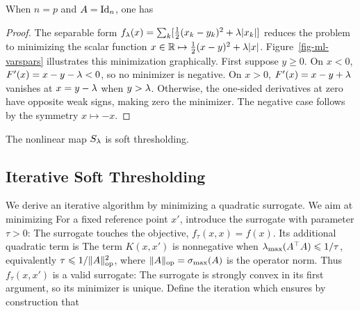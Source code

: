 \begin{prop}\label{prop-soft-tresdh}
	When $n=p$ and $A=\mathrm{Id}_n$, one has
\end{prop}
\begin{proof}
	The separable form $f_\lambda(x)=\sum_k[\frac12(x_k-y_k)^2+\lambda|x_k|]$ reduces the problem to minimizing the scalar
	function $x \in \mathbb{R} \mapsto \frac{1}{2}(x-y)^2 + \lambda |x|$. 
	Figure~\ref{fig-ml-varspars} illustrates this minimization graphically.
	First suppose $y\geq0$. On $x<0$, $F'(x)=x-y-\lambda<0$, so no minimizer is negative. On $x>0$, $F'(x)=x-y+\lambda$ vanishes at $x=y-\lambda$ when $y>\lambda$. Otherwise, the one-sided derivatives at zero have opposite weak signs, making zero the minimizer.
	The negative case follows by the symmetry $x \mapsto -x$.
\end{proof}

The nonlinear map $S_\lambda$ is soft thresholding.

\subsection{Iterative Soft Thresholding}
\label{sec-ml-ista}


We derive an iterative algorithm by minimizing a quadratic surrogate.
%
We aim at minimizing
For a fixed reference point $x'$, introduce the surrogate with parameter $\tau>0$:
The surrogate touches the objective, $f_\tau(x,x)=f(x)$. Its additional quadratic term is
The term $K(x,x')$ is nonnegative when $\lambda_{\max}(A^\top A) \leqslant 1/\tau$, equivalently $\tau \leqslant 1/\lVert A\rVert_{\text{op}}^2$, where $\lVert A\rVert_{\text{op}} = \sigma_{\max}(A)$ is the operator norm.
%
Thus $f_\tau(x,x')$ is a valid surrogate:
The surrogate is strongly convex in its first argument, so its minimizer is unique.
%
Define the iteration
which ensures by construction that

